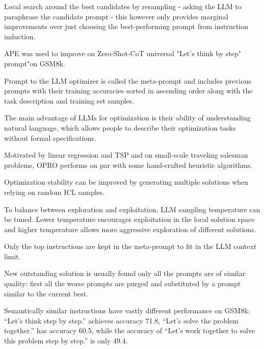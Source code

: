 Local search around the best candidates by resampling - asking the LLM to paraphrase the candidate prompt - this however only provides marginal improvements over just choosing the best-performing prompt from instruction induction. \cite{zhou2023largelanguagemodelshumanlevel}

APE was used to improve on Zero-Shot-CoT \cite{NEURIPS2022_8bb0d291} universal "Let's think by step" prompt"on GSM8k.\cite{zhou2023largelanguagemodelshumanlevel}


Prompt to the LLM optimizer is called the meta-prompt and includes previous prompts with their training accuracies sorted in ascending order along with the task description and training set samples. \cite{yang2024largelanguagemodelsoptimizers}

The main advantage of LLMs for optimization is their ability of understanding natural language, which allows people to describe their optimization tasks without formal specifications. \cite{yang2024largelanguagemodelsoptimizers}

Motivated by linear regression and TSP and on small-scale traveling salesman problems, OPRO performs on par with some hand-crafted heuristic algorithms. \cite{yang2024largelanguagemodelsoptimizers}

Optimization stability can be improved by generating multiple solutions when relying on random ICL samples. \cite{yang2024largelanguagemodelsoptimizers}

To balance between exploration and exploitation, LLM sampling temperature can be tuned. Lower temperature encourages exploitation in the local solution space and higher temperature allows more aggressive exploration of different solutions. \cite{yang2024largelanguagemodelsoptimizers}

Only the top instructions are kept in the meta-prompt to fit in the LLM context limit. \cite{yang2024largelanguagemodelsoptimizers}

New outstanding solution is usually found only all the prompts are of similar quality: first all the worse prompts are purged and substituted by a prompt similar to the current best. \cite{yang2024largelanguagemodelsoptimizers}

Semantically similar instructions have vastly different performance on GSM8k: “Let’s think step by step.” achieves accuracy 71.8, “Let’s solve the problem together.” has accuracy 60.5, while the accuracy of “Let’s work together to solve this problem step by step.” is only 49.4. \cite{yang2024largelanguagemodelsoptimizers}






